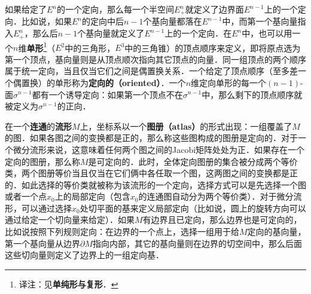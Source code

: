 如果给定了$E^n$的一个定向，那么每一个半空间$E^n_+$就定义了边界面$E^{n-1}$上的一个定向．比如说，如果$E^n$的定向中后$n-1$个基向量都落在$E^{n-1}$中，而第一个基向量指入$E^n_+$，那么后$n-1$个基向量就定义了$E^{n-1}$上的一个定向．在$E^n$中，也可以用一个$n$维\textbf{单形}\footnote{译注：见\textbf{单纯形与复形}．}（$E^2$中的三角形，$E^3$中的三角锥）的顶点顺序来定义，即将原点选为第一个顶点，基向量则是从顶点顺次指向其它顶点的向量．同一组顶点的两个顺序属于统一定向，当且仅当它们之间是偶置换关系．一个给定了顶点顺序（至多差一个偶置换）的单形称为\textbf{定向的（oriented）}．一个$n$维定向单形的每一个$(n-1)$-面$\sigma^{n-1}$都有一个诱导定向：如果第一个顶点不在$\sigma^{n-1}$中，那么剩下的顶点顺序就被定义为$\sigma^{n-1}$的正向．




在一个\textbf{连通}的\textbf{流形}$M$上，坐标系以一个\textbf{图册（atlas）}的形式出现：一组覆盖了$M$的图．如果各图之间的变换都是正的，那么称这些图构成的图册是定向的．对于一个微分流形来说，这意味着任何两个图之间的Jacobi矩阵处处为正．如果存在一个定向的图册，那么称$M$是可定向的．此时，全体定向图册的集合被分成两个等价类，两个图册等价当且仅当在它们俩中各任取一个图，这两图之间的变换都是正的．如此选择的等价类就被称为该流形的一个定向，选择方式可以是先选择一个图或者一个点$x_0$上的局部定向（包含$x_0$的连通图自动分为两个等价类）．对于微分流形，可以通过选择$x_0$处切平面的基来定义局部定向（比如说，圆上的旋转方向可以通过给定一个切向量来给定）．如果$M$有边界且已定向，那么边界也是可定向的，比如说按照下列规则定向：在边界的一个点上，选择一组用于给$M$定向的基向量，第一个基向量从边界$\partial M$指向内部，其它的基向量则在边界的切空间中，那么后面这些切向量则定义了边界上的一组定向基．


